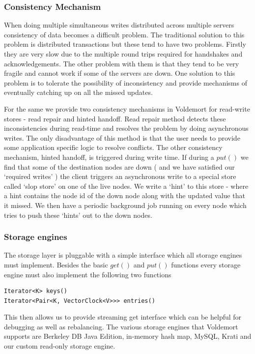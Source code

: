 \documentclass[10pt,twocolumn,preprint,natbib,authoryear]{sigplanconf}
\begin{document}
\subsubsection {Consistency Mechanism }

When doing multiple simultaneous writes distributed across multiple servers consistency of data becomes a difficult problem. The traditional solution to this problem is distributed transactions but these tend to have two problems. Firstly they are very slow due to the multiple round trips required for handshakes and acknowledgements. The other problem with them is that they tend to be very fragile and cannot work if some of the servers are down. One solution to this problem is to tolerate the possibility of inconsistency and provide mechanisms of eventually catching up on all the missed updates. 

For the same we provide two consistency mechanisms in Voldemort for read-write stores - read repair and hinted handoff. Read repair method detects these inconsistencies during read-time and resolves the problem by doing asynchronous writes. The only disadvantage of this method is that the user needs to provide some application specific logic to resolve conflicts. The other consistency mechanism, hinted handoff, is triggered during write time. If during a $put()$ we find that some of the destination nodes are down ( and we have  satisfied our `required writes' ) the client triggers an asynchronous write to a special store called `slop store' on one of the live nodes. We write a `hint' to this store - where a hint contains the node id of the down node along with the updated value that it missed. We then have a periodic background job running on every node which tries to push these `hints' out to the down nodes.

\subsubsection {Storage engines}
The storage layer is pluggable with a simple interface which all storage engines must implement. Besides the basic $get()$ and $put()$ functions every storage engine must also implement the following two functions 
\begin{verbatim}
Iterator<K> keys() 
Iterator<Pair<K, VectorClock<V>>> entries()
\end{verbatim}  
This then allows us to provide streaming get interface which can be helpful for debugging as well as rebalancing. The various storage engines that Voldemort supports are Berkeley DB Java Edition, in-memory hash map, MySQL, Krati and our custom read-only storage engine. 
\end{document}
